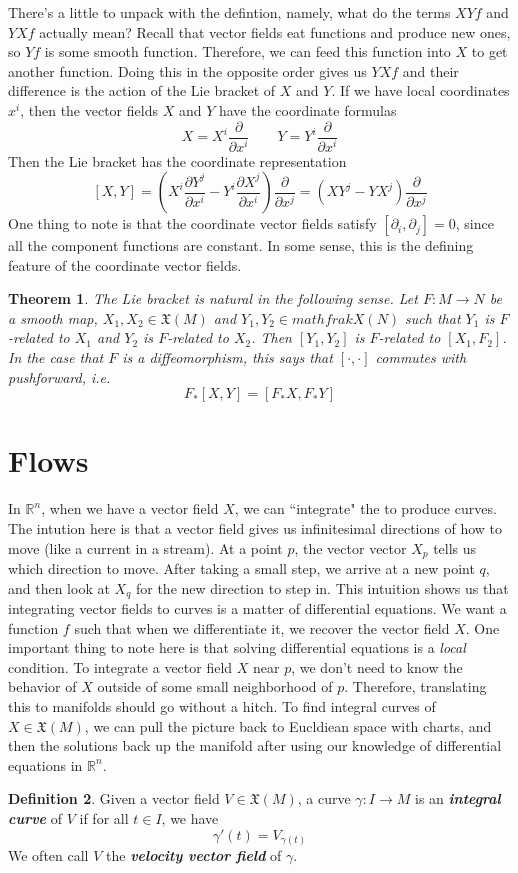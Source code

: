 \documentclass[psamsfonts]{amsart}
\newtheorem{thm}{Theorem}[section]
\theoremstyle{definition}
\newtheorem{defn}[thm]{Definition}
\theoremstyle{remark}
\newcommand{\R}{\mathbb{R}}
\newcommand{\ib}[1]{\textbf{\textit{#1}}}
\begin{document}
%
There's a little to unpack with the defintion, namely, what do the terms
$XYf$ and $YXf$ actually mean? Recall that vector fields eat functions and
produce new ones, so $Yf$ is some smooth function. Therefore, we can feed this
function into $X$ to get another function. Doing this in the opposite order
gives us $YXf$ and their difference is the action of the Lie bracket of $X$
and $Y$. If we have local coordinates $x^i$, then the vector fields $X$
and $Y$ have the coordinate formulas
\[
X = X^i \frac{\partial}{\partial x^i} \qquad Y = Y^i \frac{\partial }{\partial x^i}
\]
Then the Lie bracket has the coordinate representation
\[
[X,Y] = \left( X^i\frac{\partial Y^j}{\partial x^i} - Y^i\frac{\partial X^j}{\partial x^i}
\right) \frac{\partial}{\partial x^j} = \left( XY^j - YX^j \right)
\frac{\partial}{\partial x^j}
\]
One thing to note is that the coordinate vector fields satisfy
$[\partial_i,\partial_j] = 0$, since all the component functions are constant.
In some sense, this is the defining feature of the coordinate vector fields.
%
\begin{thm}
The Lie bracket is natural in the following sense. Let $F : M \to N$
be a smooth map, $X_1, X_2 \in \mathfrak{X}(M)$ and $Y_1,Y_2 \in mathfrak{X}(N)$
such that $Y_1$ is $F$-related to $X_1$ and $Y_2$ is $F$-related to $X_2$. Then
$[Y_1,Y_2]$ is $F$-related to $[X_1,F_2]$. In the case that $F$ is a diffeomorphism,
this says that $[\cdot,\cdot]$ commutes with pushforward, i.e.
\[
F_*[X,Y] = [F_*X,F_*Y]
\]
\end{thm}
%
\section{Flows}
%
In $\R^n$, when we have a vector field $X$, we can ``integrate" the to produce
curves. The intution here is that a vector field gives us infinitesimal directions
of how to move (like a current in a stream). At a point $p$, the vector
vector $X_p$ tells us which direction to move. After taking a small step, we
arrive at a new point $q$, and then look at $X_q$ for the new direction to step
in. This intuition shows us that integrating vector fields to curves is a
matter of differential equations. We want a function $f$ such that
when we differentiate it, we recover the vector field $X$. One important
thing to note here is that solving differential equations is a \emph{local}
condition. To integrate a vector field $X$ near $p$, we don't need
to know the behavior of $X$ outside of some small neighborhood of $p$. Therefore,
translating this to manifolds should go without a hitch. To find integral curves
of $X \in \mathfrak{X}(M)$, we can pull the picture back to Eucldiean space
with charts, and then the solutions back up the manifold after using our
knowledge of differential equations in $\R^n$.
%
\begin{defn}
Given a vector field $V \in \mathfrak{X}(M)$, a curve $\gamma : I \to M$
is an \ib{integral curve} of $V$ if for all $t \in I$, we have
\[
\gamma'(t) = V_{\gamma(t)}
\]
We often call $V$ the \ib{velocity vector field} of $\gamma$.
\end{defn}
%
\end{document}
